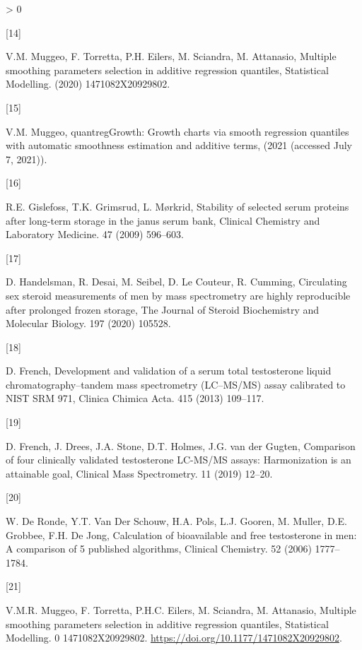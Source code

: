 \documentclass[]{elsarticle} %
\newlength{\csllabelwidth}
\newlength{\cslhangindent}
\newenvironment{CSLReferences}[3] %
 {%
  \setlength{\parindent}{0pt}
  \ifodd #1 \everypar{\setlength{\hangindent}{\cslhangindent}}\ignorespaces\fi
  \ifnum #2 > 0
  \setlength{\parskip}{#2\baselineskip}
  \fi
 }%
 {}
\newcommand{\CSLLeftMargin}[1]{\parbox[t]{\csllabelwidth}{#1}}
\newcommand{\CSLRightInline}[1]{\parbox[t]{\linewidth - \csllabelwidth}{#1}}
\begin{document}
\begin{CSLReferences}{0}{0}
\leavevmode\hypertarget{ref-muggeo2020multiple}{}%
\CSLLeftMargin{{[}14{]} }
\CSLRightInline{V.M. Muggeo, F. Torretta, P.H. Eilers, M. Sciandra, M.
Attanasio, Multiple smoothing parameters selection in additive
regression quantiles, Statistical Modelling. (2020) 1471082X20929802.}

\leavevmode\hypertarget{ref-quantreggrowth}{}%
\CSLLeftMargin{{[}15{]} }
\CSLRightInline{V.M. Muggeo, quantregGrowth: Growth charts via smooth
regression quantiles with automatic smoothness estimation and additive
terms, (2021 (accessed July 7, 2021)).}

\leavevmode\hypertarget{ref-gislefoss2009stability}{}%
\CSLLeftMargin{{[}16{]} }
\CSLRightInline{R.E. Gislefoss, T.K. Grimsrud, L. Mørkrid, Stability of
selected serum proteins after long-term storage in the janus serum bank,
Clinical Chemistry and Laboratory Medicine. 47 (2009) 596--603.}

\leavevmode\hypertarget{ref-handelsman2020circulating}{}%
\CSLLeftMargin{{[}17{]} }
\CSLRightInline{D. Handelsman, R. Desai, M. Seibel, D. Le Couteur, R.
Cumming, Circulating sex steroid measurements of men by mass
spectrometry are highly reproducible after prolonged frozen storage, The
Journal of Steroid Biochemistry and Molecular Biology. 197 (2020)
105528.}

\leavevmode\hypertarget{ref-french2013development}{}%
\CSLLeftMargin{{[}18{]} }
\CSLRightInline{D. French, Development and validation of a serum total
testosterone liquid chromatography--tandem mass spectrometry (LC--MS/MS)
assay calibrated to NIST SRM 971, Clinica Chimica Acta. 415 (2013)
109--117.}

\leavevmode\hypertarget{ref-french2019comparison}{}%
\CSLLeftMargin{{[}19{]} }
\CSLRightInline{D. French, J. Drees, J.A. Stone, D.T. Holmes, J.G. van
der Gugten, Comparison of four clinically validated testosterone
LC-MS/MS assays: Harmonization is an attainable goal, Clinical Mass
Spectrometry. 11 (2019) 12--20.}

\leavevmode\hypertarget{ref-de2006calculation}{}%
\CSLLeftMargin{{[}20{]} }
\CSLRightInline{W. De Ronde, Y.T. Van Der Schouw, H.A. Pols, L.J.
Gooren, M. Muller, D.E. Grobbee, F.H. De Jong, Calculation of
bioavailable and free testosterone in men: A comparison of 5 published
algorithms, Clinical Chemistry. 52 (2006) 1777--1784.}

\leavevmode\hypertarget{ref-quantreg1}{}%
\CSLLeftMargin{{[}21{]} }
\CSLRightInline{V.M.R. Muggeo, F. Torretta, P.H.C. Eilers, M. Sciandra,
M. Attanasio, Multiple smoothing parameters selection in additive
regression quantiles, Statistical Modelling. 0 1471082X20929802.
\url{https://doi.org/10.1177/1471082X20929802}.}


\end{CSLReferences}
\end{document}
